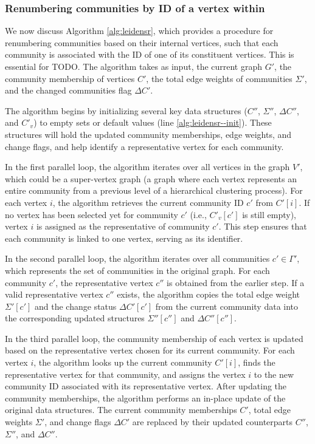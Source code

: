 \subsubsection{Renumbering communities by ID of a vertex within}

We now discuss Algorithm \ref{alg:leidensr}, which provides a procedure for renumbering communities based on their internal vertices, such that each community is associated with the ID of one of its constituent vertices. This is essential for TODO. The algorithm takes as input, the current graph $G'$, the community membership of vertices $C'$, the total edge weights of communities $\Sigma'$, and the changed communities flag $\Delta C'$.

The algorithm begins by initializing several key data structures ($C''$, $\Sigma''$, $\Delta C''$, and $C'_v$) to empty sets or default values (line \ref{alg:leidensr--init}). These structures will hold the updated community memberships, edge weights, and change flags, and help identify a representative vertex for each community.

In the first parallel loop, the algorithm iterates over all vertices in the graph $V'$, which could be a super-vertex graph (a graph where each vertex represents an entire community from a previous level of a hierarchical clustering process). For each vertex $i$, the algorithm retrieves the current community ID $c'$ from $C'[i]$. If no vertex has been selected yet for community $c'$ (i.e., $C'_v[c']$ is still empty), vertex $i$ is assigned as the representative of community $c'$. This step ensures that each community is linked to one vertex, serving as its identifier.

In the second parallel loop, the algorithm iterates over all communities $c' \in \Gamma'$, which represents the set of communities in the original graph. For each community $c'$, the representative vertex $c''$ is obtained from the earlier step. If a valid representative vertex $c''$ exists, the algorithm copies the total edge weight $\Sigma'[c']$ and the change status $\Delta C'[c']$ from the current community data into the corresponding updated structures $\Sigma''[c'']$ and $\Delta C''[c'']$.

In the third parallel loop, the community membership of each vertex is updated based on the representative vertex chosen for its current community. For each vertex $i$, the algorithm looks up the current community $C'[i]$, finds the representative vertex for that community, and assigns the vertex $i$ to the new community ID associated with its representative vertex. After updating the community memberships, the algorithm performs an in-place update of the original data structures. The current community memberships $C'$, total edge weights $\Sigma'$, and change flags $\Delta C'$ are replaced by their updated counterparts $C''$, $\Sigma''$, and $\Delta C''$.



